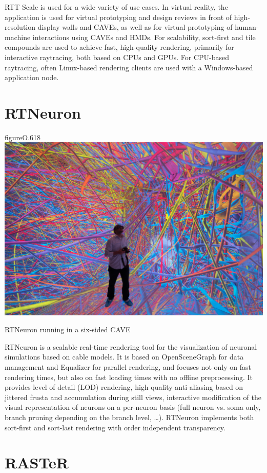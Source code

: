RTT Scale is used for a wide variety of use cases. In virtual reality, the
application is used for virtual prototyping and design reviews in front of
high-resolution display walls and CAVEs, as well as for virtual prototyping of
human-machine interactions using CAVEs and HMDs. For scalability, sort-first and
tile compounds are used to achieve fast, high-quality rendering, primarily for
interactive raytracing, both based on CPUs and GPUs. For CPU-based raytracing,
often Linux-based rendering clients are used with a Windows-based application
node.

\section{RTNeuron}\label{sRTNeuron}

\begin{wrapfloat}{figure}{O}{.618\textwidth}
  \includegraphics[width=.618\textwidth]{images/RTNeuron}
  {\caption{\label{fRTNeuron}RTNeuron running in a six-sided CAVE}}
\end{wrapfloat}

RTNeuron \cite{HBBES:13} is a scalable real-time rendering tool for the
visualization of neuronal simulations based on cable models. It is based on
OpenSceneGraph for data management and Equalizer for parallel rendering, and
focuses not only on fast rendering times, but also on fast loading times with no
offline preprocessing. It provides level of detail (LOD) rendering, high quality
anti-aliasing based on jittered frusta and accumulation during still views,
interactive modification of the visual representation of neurons on a per-neuron
basis (full neuron vs. soma only, branch pruning depending on the branch level,
\dots). RTNeuron implements both sort-first and sort-last rendering with order
independent transparency.

\section{RASTeR}

